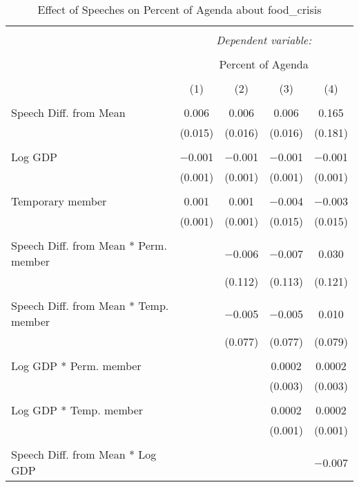 
\begin{table}[!htbp] \centering 
  \caption{Effect of Speeches on Percent of Agenda about food_crisis} 
  \label{} 
\begin{tabular}{@{\extracolsep{5pt}}lcccc} 
\\[-1.8ex]\hline 
\hline \\[-1.8ex] 
 & \multicolumn{4}{c}{\textit{Dependent variable:}} \\ 
\cline{2-5} 
\\[-1.8ex] & \multicolumn{4}{c}{Percent of Agenda} \\ 
\\[-1.8ex] & (1) & (2) & (3) & (4)\\ 
\hline \\[-1.8ex] 
 Speech Diff. from Mean & 0.006 & 0.006 & 0.006 & 0.165 \\ 
  & (0.015) & (0.016) & (0.016) & (0.181) \\ 
  & & & & \\ 
 Log GDP & $-$0.001 & $-$0.001 & $-$0.001 & $-$0.001 \\ 
  & (0.001) & (0.001) & (0.001) & (0.001) \\ 
  & & & & \\ 
 Temporary member & 0.001 & 0.001 & $-$0.004 & $-$0.003 \\ 
  & (0.001) & (0.001) & (0.015) & (0.015) \\ 
  & & & & \\ 
 Speech Diff. from Mean * Perm. member &  & $-$0.006 & $-$0.007 & 0.030 \\ 
  &  & (0.112) & (0.113) & (0.121) \\ 
  & & & & \\ 
 Speech Diff. from Mean * Temp. member &  & $-$0.005 & $-$0.005 & 0.010 \\ 
  &  & (0.077) & (0.077) & (0.079) \\ 
  & & & & \\ 
 Log GDP * Perm. member &  &  & 0.0002 & 0.0002 \\ 
  &  &  & (0.003) & (0.003) \\ 
  & & & & \\ 
 Log GDP * Temp. member &  &  & 0.0002 & 0.0002 \\ 
  &  &  & (0.001) & (0.001) \\ 
  & & & & \\ 
 Speech Diff. from Mean * Log GDP &  &  &  & $-$0.007 \\ 

\end{tabular}
\end{table}
